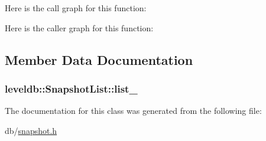 Here is the call graph for this function\-:




Here is the caller graph for this function\-:




\subsection{Member Data Documentation}
\hypertarget{classleveldb_1_1_snapshot_list_a7c45d05759fcc3853c140816da181b0c}{
\subsubsection[{list\-\_\-}]{ leveldb\-::\-Snapshot\-List\-::list\-\_\-\hspace{0.3cm}{\ttfamily [private]}}}\label{classleveldb_1_1_snapshot_list_a7c45d05759fcc3853c140816da181b0c}


The documentation for this class was generated from the following file\-:\begin{DoxyCompactItemize}
\item 
db/\hyperlink{snapshot_8h}{snapshot.\-h}\end{DoxyCompactItemize}
